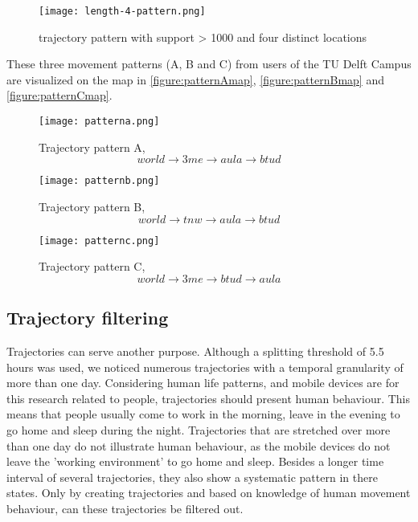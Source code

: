 \begin{figure}[H]
\centering
\texttt{[image: length-4-pattern.png]}
\captionsetup{justification=centering}
\caption{trajectory pattern with support > 1000 and four distinct locations}
\label{figure:len4pattern}
\end{figure}

These three movement patterns (A, B and C) from users of the TU Delft Campus are visualized on the map in \autoref{figure:patternAmap}, \autoref{figure:patternBmap} and \autoref{figure:patternCmap}.

\begin{figure}[H]
\centering
\texttt{[image: patterna.png]}
\captionsetup{justification=centering}
\caption{Trajectory pattern A, $$world\rightarrow 3me \rightarrow aula \rightarrow btud$$}
\label{figure:patternAmap}
\end{figure}

\begin{figure}[H]
\centering
\texttt{[image: patternb.png]}
\captionsetup{justification=centering}
\caption{Trajectory pattern B, $$world\rightarrow tnw \rightarrow aula \rightarrow btud$$}
\label{figure:patternBmap}
\end{figure}

\begin{figure}[H]
\centering
\texttt{[image: patternc.png]}
\captionsetup{justification=centering}
\caption{Trajectory pattern C, $$world\rightarrow 3me \rightarrow btud \rightarrow aula$$}
\label{figure:patternCmap}
\end{figure}

\subsection{Trajectory filtering}
Trajectories can serve another purpose. Although a splitting threshold of 5.5 hours was used, we noticed numerous trajectories with a temporal granularity of more than one day. Considering human life patterns, and mobile devices are for this research related to people, trajectories should present human behaviour. This means that people usually come to work in the morning, leave in the evening to go home and sleep during the night. Trajectories that are stretched over more than one day do not illustrate human behaviour, as the mobile devices do not leave the 'working environment' to go home and sleep. Besides a longer time interval of several trajectories, they also show a systematic pattern in there states. Only by creating trajectories and based on knowledge of human movement behaviour, can these trajectories be filtered out. 
